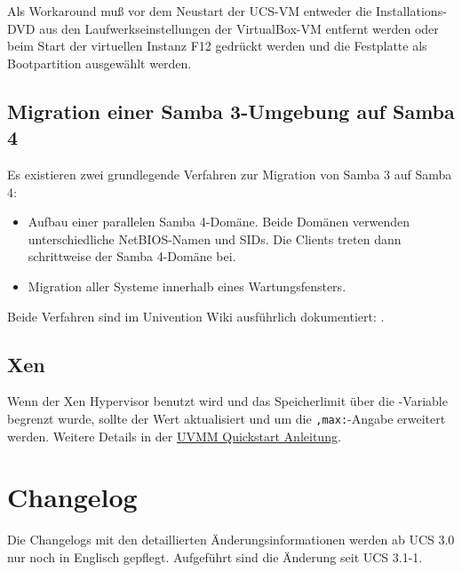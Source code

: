 Als Workaround muß vor dem Neustart der UCS-VM entweder die
Installations-DVD aus den Laufwerkseinstellungen der VirtualBox-VM
entfernt werden oder beim Start der virtuellen Instanz F12 gedrückt
werden und die Festplatte als Bootpartition ausgewählt werden.

\section{Migration einer Samba 3-Umgebung auf Samba 4}
\label{samba-migration}

Es existieren zwei grundlegende Verfahren zur Migration von Samba 3 auf Samba
4:

\begin{itemize}
\item Aufbau einer parallelen Samba 4-Domäne. Beide Domänen verwenden
unterschiedliche NetBIOS-Namen und SIDs. Die Clients treten dann schrittweise
der Samba 4-Domäne bei.
\item Migration aller Systeme innerhalb eines Wartungsfensters.
\end{itemize}

Beide Verfahren sind im Univention Wiki ausführlich dokumentiert:
.

\section{Xen} %
Wenn der Xen Hypervisor benutzt wird und das Speicherlimit über die \ucsUCR{}-Variable  begrenzt wurde, sollte der Wert aktualisiert und um die \texttt{,max:}-Angabe erweitert werden.
Weitere Details in der \href{http://wiki.univention.de/index.php?title=UVMM_Quickstart-3.1#Konfiguration_der_Dom0}{UVMM Quickstart Anleitung}.

\chapter{Changelog}

Die Changelogs mit den detaillierten Änderungsinformationen werden ab UCS 3.0
nur noch in Englisch gepflegt. Aufgeführt sind die Änderung seit UCS 3.1-1.






